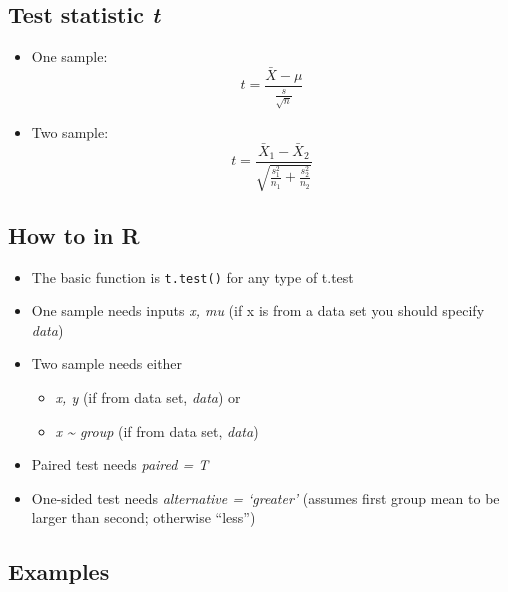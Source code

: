 \documentclass[
]{book}
\providecommand{\tightlist}{%
  \setlength{\itemsep}{0pt}\setlength{\parskip}{0pt}}
\begin{document}
\subsection{\texorpdfstring{Test statistic \emph{t}}{Test statistic t}}\label{test-statistic-t-1}

\begin{itemize}
\item
  One sample: \[ t = \frac{\bar{X} - \mu}{\frac{s}{\sqrt{n}}} \]
\item
  Two sample: \[t = \frac{\bar{X}_1 - \bar{X}_2}{\sqrt{\frac{s_1^2}{n_1} + \frac{s_2^2}{n_2}}} \]
\end{itemize}

\subsection{How to in R}\label{how-to-in-r-1}

\begin{itemize}
\tightlist
\item
  The basic function is \texttt{t.test()} for any type of t.test
\item
  One sample needs inputs \emph{x, mu} (if x is from a data set you should specify \emph{data})
\item
  Two sample needs either

  \begin{itemize}
  \tightlist
  \item
    \emph{x, y} (if from data set, \emph{data}) or
  \item
    \emph{x \textasciitilde{} group} (if from data set, \emph{data})
  \end{itemize}
\item
  Paired test needs \emph{paired = T}
\item
  One-sided test needs \emph{alternative = `greater'} (assumes first group mean to be larger than second; otherwise ``less'')
\end{itemize}

\subsection{Examples}\label{examples}
\end{document}
